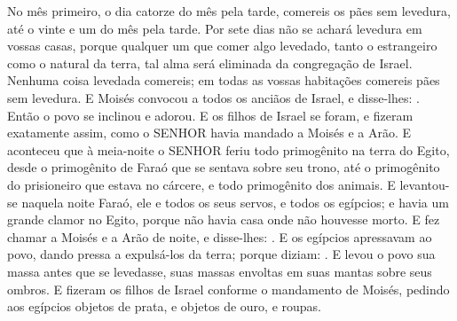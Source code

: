 {{  No mês primeiro, o dia catorze do mês pela tarde, comereis os pães sem levedura, até o vinte e um do mês pela tarde.
  Por sete dias não se achará levedura em vossas casas, porque qualquer um que comer algo levedado, tanto o estrangeiro como o natural da terra, tal alma será eliminada da congregação de Israel.
  Nenhuma coisa levedada comereis; em todas as vossas habitações comereis pães sem levedura}.
  E Moisés convocou a todos os anciãos de Israel, e disse-lhes: . Então o povo se inclinou e adorou.
  E os filhos de Israel se foram, e fizeram exatamente assim, como o SENHOR havia mandado a Moisés e a Arão.
  E aconteceu que à meia-noite o SENHOR feriu todo primogênito na terra do Egito, desde o primogênito de Faraó que se sentava sobre seu trono, até o primogênito do prisioneiro que estava no cárcere, e todo primogênito dos animais.
  E levantou-se naquela noite Faraó, ele e todos os seus servos, e todos os egípcios; e havia um grande clamor no Egito, porque não havia casa onde não houvesse morto.
  E fez chamar a Moisés e a Arão de noite, e disse-lhes: .
  E os egípcios apressavam ao povo, dando pressa a expulsá-los da terra; porque diziam: .
  E levou o povo sua massa antes que se levedasse, suas massas envoltas em suas mantas sobre seus ombros.
  E fizeram os filhos de Israel conforme o mandamento de Moisés, pedindo aos egípcios objetos de prata, e objetos de ouro, e roupas.
}
